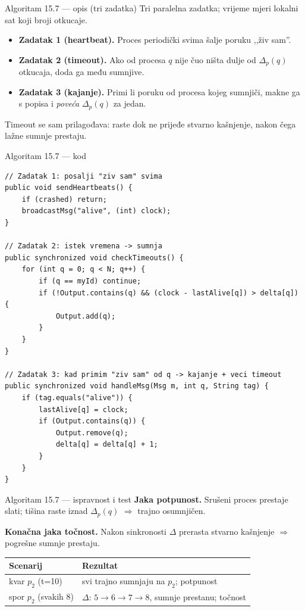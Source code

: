 \documentclass[aspectratio=169,11pt]{beamer}
\begin{document}
\begin{frame}{Algoritam 15.7 --- opis (tri zadatka)}
  Tri paralelna zadatka; vrijeme mjeri lokalni sat koji broji otkucaje.
  \begin{itemize}
    \item \textbf{Zadatak 1 (heartbeat).} Proces periodički svima šalje poruku
      ,,živ sam''.
    \item \textbf{Zadatak 2 (timeout).} Ako od procesa $q$ nije čuo ništa dulje od
      $\Delta_p(q)$ otkucaja, doda ga među sumnjive.
    \item \textbf{Zadatak 3 (kajanje).} Primi li poruku od procesa kojeg
      sumnjiči, makne ga s popisa i \emph{poveća} $\Delta_p(q)$ za jedan.
  \end{itemize}
  \vfill
  \footnotesize Timeout se sam prilagođava: raste dok ne prijeđe stvarno
  kašnjenje, nakon čega lažne sumnje prestaju.
\end{frame}

\begin{frame}{Algoritam 15.7 --- kod}
\begin{lstlisting}
// Zadatak 1: posalji "ziv sam" svima
public void sendHeartbeats() {
    if (crashed) return;
    broadcastMsg("alive", (int) clock);
}

// Zadatak 2: istek vremena -> sumnja
public synchronized void checkTimeouts() {
    for (int q = 0; q < N; q++) {
        if (q == myId) continue;
        if (!Output.contains(q) && (clock - lastAlive[q]) > delta[q]) {
            Output.add(q);
        }
    }
}

// Zadatak 3: kad primim "ziv sam" od q -> kajanje + veci timeout
public synchronized void handleMsg(Msg m, int q, String tag) {
    if (tag.equals("alive")) {
        lastAlive[q] = clock;
        if (Output.contains(q)) {
            Output.remove(q);
            delta[q] = delta[q] + 1;
        }
    }
}
\end{lstlisting}
\end{frame}

\begin{frame}{Algoritam 15.7 --- ispravnost i test}
  \textbf{Jaka potpunost.} Srušeni proces prestaje slati; tišina raste iznad
  $\Delta_p(q)$ $\Rightarrow$ trajno osumnjičen.

  \textbf{Konačna jaka točnost.} Nakon sinkronosti $\Delta$ prerasta stvarno
  kašnjenje $\Rightarrow$ pogrešne sumnje prestaju.
  \vfill
  \centering
  \small
  \begin{tabular}{ll}
    \toprule
    Scenarij & Rezultat \\
    \midrule
    kvar $p_2$ (t=10)        & svi trajno sumnjaju na $p_2$; potpunost \\
    spor $p_2$ (svakih 8)    & $\Delta$: $5{\to}6{\to}7{\to}8$, sumnje prestanu; točnost \\
    \bottomrule
  \end{tabular}
\end{frame}
\end{document}
